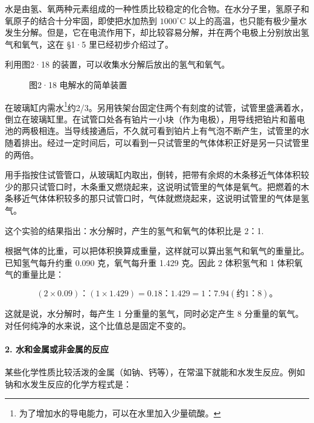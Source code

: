 水是由氢、氧两种元素组成的一种性质比较稳定的化合物。在水分子里，氢原子和氧原子的结合十分牢固，即使把水加热到
\(1000^{\circ}\mathrm{C}\)
以上的高温，也只能有极少量水发生分解。但是，它在电流作用下，却比较容易分解，并在两个电极上分别放出氢气和氧气，这在
§1·5 里已经初步介绍过了。

利用图2·18 的装置，可以收集水分解后放出的氢气和氧气。

\begin{figure}
\centering
\caption{图2·18 电解水的简单装置}
\end{figure}

在玻璃缸内需水\footnote{为了增加水的导电能力，可以在水里加入少量硫酸。}约2/3。另用铁架台固定住两个有刻度的试管，试管里盛满着水，倒立在玻璃缸里。在试管口处各有铂片一小块（作为电极），用导线把铂片和蓄电池的两极相连。当导线接通后，不久就可看到铂片上有气泡不断产生，试管里的水随着排出。经过一定时间后，可以看到一只试管里的气体体积正好是另一只试管里的两倍。

用手指按住试管管口，从玻璃缸内取出，倒转，把带有余烬的木条移近气体体积较少的那只试管口时，木条重又燃烧起来，这说明试管里的气体是氧气。把燃着的木条移近气体体积较多的那只试管口时，气体就燃烧起来，这说明试管里的气体是氢气。

这个实验的结果指出：水分解时，产生的氢气和氧气的体积比是 2：1.

根据气体的比重，可以把体积换算成重量，这样就可以算出氢气和氧气的重量比。已知氢气每升约重
0.090 克，氧气每升重 1.429 克。因此 2 体积氢气和 1 体积氧气的重量比是：

\[
(2 \times 0.09)\text{：} (1 \times 1.429) = 0.18\text{：} 1.429 = 1\text{：} 7.94 (\text{约} 1\text{：} 8)\text{。}
\]

这就是说，水分解时，每产生 1 分重量的氢气，同时必定产生 8
分重量的氧气。对任何纯净的水来说，这个比值总是固定不变的。

\paragraph{2. 水和金属或非金属的反应}

某些化学性质比较活泼的金属（如钠、钙等），在常温下就能和水发生反应。例如钠和水发生反应的化学方程式是：

